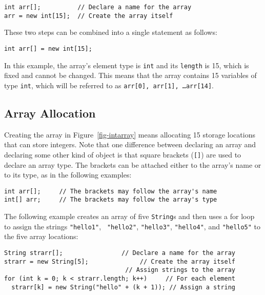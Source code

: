 \begin{jjjlisting}
\begin{lstlisting}
int arr[];          // Declare a name for the array
arr = new int[15];  // Create the array itself
\end{lstlisting}
\end{jjjlisting}

\noindent These two steps can be combined into a single statement
as follows:

\begin{jjjlisting}
\begin{lstlisting}
int arr[] = new int[15];
\end{lstlisting}
\end{jjjlisting}

\noindent In this example, the array's element type is {\tt int} and
its {\tt length} is 15, which is fixed and cannot be changed.  This
means that the array contains 15 variables of type {\tt int}, which
will be referred to as {\tt arr[0], arr[1], \dots arr[14]}.

\subsection{Array Allocation}
\noindent Creating the array in Figure~\ref{fig-intarray}  means allocating
15 storage locations that can store integers.  Note that one
difference between declaring an array and declaring some other kind of
object is that square brackets ({\tt []}) are used to declare an array
type.  The brackets can be attached either to the array's name or to
its type, as in the following examples:

\begin{jjjlisting}
\begin{lstlisting}
int arr[];     // The brackets may follow the array's name
int[] arr;     // The brackets may follow the array's type
\end{lstlisting}
\end{jjjlisting}

\noindent The following example creates an array of five {\tt String}s
and then uses a for loop to assign the strings {\tt "hello1"}, {\tt
"hello2"}, {\tt "hello3"}, {\tt "hello4"}, and {\tt "hello5"} to the
five array locations:

\begin{jjjlisting}[28pc]
\begin{lstlisting}
String strarr[];                // Declare a name for the array
strarr = new String[5];              // Create the array itself
                                 // Assign strings to the array
for (int k = 0; k < strarr.length; k++)     // For each element
  strarr[k] = new String("hello" + (k + 1)); // Assign a string
\end{lstlisting}
\end{jjjlisting}

